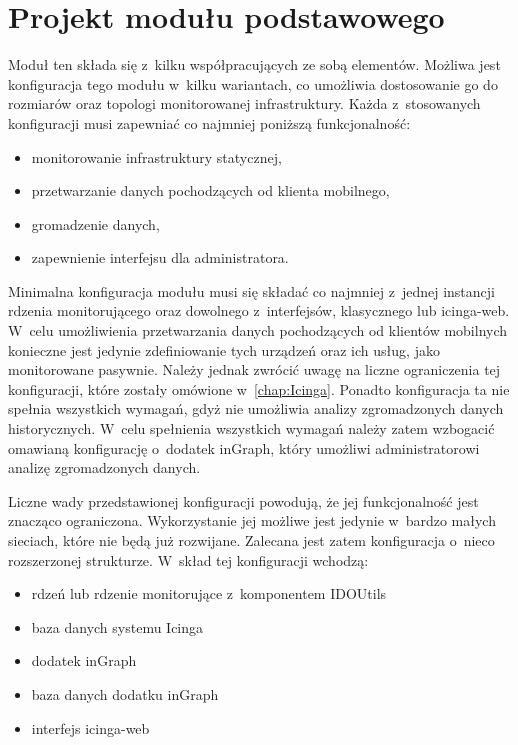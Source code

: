 \section[Projekt modułu podstawowego][Projekt modułu podstawowego]{Projekt modułu podstawowego}

Moduł ten składa się z~kilku współpracujących ze sobą
elementów. Możliwa jest konfiguracja tego modułu w~kilku wariantach,
co umożliwia dostosowanie go do rozmiarów oraz topologi monitorowanej
infrastruktury. Każda z~stosowanych konfiguracji musi zapewniać
co najmniej poniższą funkcjonalność:

\begin{itemize}
\item monitorowanie infrastruktury statycznej,
\item przetwarzanie danych pochodzących od klienta mobilnego,
\item gromadzenie danych,
\item zapewnienie interfejsu dla administratora.
\end{itemize}

Minimalna konfiguracja modułu musi się składać co najmniej z~jednej
instancji rdzenia monitorującego oraz dowolnego z~interfejsów,
klasycznego lub icinga-web. W~celu umożliwienia przetwarzania danych
pochodzących od klientów mobilnych konieczne jest jedynie
zdefiniowanie tych urządzeń oraz ich usług, jako monitorowane
pasywnie. Należy jednak zwrócić uwagę na liczne ograniczenia tej
konfiguracji, które zostały omówione w~\ref{chap:Icinga}. Ponadto
konfiguracja ta nie spełnia wszystkich wymagań, gdyż nie umożliwia
analizy zgromadzonych danych historycznych. W~celu spełnienia
wszystkich wymagań należy zatem wzbogacić omawianą konfigurację
o~dodatek inGraph, który umożliwi administratorowi analizę
zgromadzonych danych.

Liczne wady przedstawionej konfiguracji powodują, że jej
funkcjonalność jest znacząco ograniczona. Wykorzystanie jej możliwe
jest jedynie w~bardzo małych sieciach, które nie będą już
rozwijane. Zalecana jest zatem konfiguracja o~nieco rozszerzonej
strukturze. W~skład tej konfiguracji wchodzą:

\begin{itemize}
\item rdzeń lub rdzenie monitorujące z~komponentem IDOUtils
\item baza danych systemu Icinga
\item dodatek inGraph
\item baza danych dodatku inGraph
\item interfejs icinga-web
\end{itemize}

